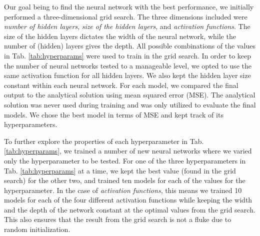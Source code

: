 Our goal being to find the neural network with the best performance, we initially performed a three-dimensional grid search.
The three dimensions included were \textit{number of hidden layers}, \textit{size of the hidden layers}, and \textit{activation functions}.
The size of the hidden layers dictates the width of the neural network, while the number of (hidden) layers gives the depth. 
All possible combinations of the values in Tab. \ref{tab:hyperparams} were used to train in the grid search.
In order to keep the number of neural networks tested to a manageable level, we opted to use the same activation function for all hidden layers.
We also kept the hidden layer size constant within each neural network.
For each model, we compared the final output to the analytical solution using mean squared error (MSE).
The analytical solution was never used during training and was only utilized to evaluate the final models.
We chose the best model in terms of MSE and kept track of its hyperparameters.


To further explore the properties of each hyperparameter in Tab. \ref{tab:hyperparams}, we trained a number of new neural networks where we varied only the hyperparameter to be tested.
For one of the three hyperparameters in Tab. \ref{tab:hyperparams} at a time, we kept the best value (found in the grid search) for the other two, and trained ten models for each of the values for the hyperparameter. 
In the case of \textit{activation functions}, this means we trained 10 models for each of the four different activation functions while keeping the width and the depth of the network constant at the optimal values from the grid search.
This also ensures that the result from the grid search is not a fluke due to random initialization.



